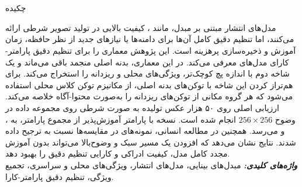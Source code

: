 \newpage
\thispagestyle{empty}
\baselineskip=1.0cm
\ \\ \\
\begin{large}
\begin{center}
چکیده
\end{center}
\end{large}
مدل‌های انتشار مبتنی بر مبدل، مانند ، کیفیت بالایی در تولید تصویر شرطی ارائه می‌کنند، اما تنظیم دقیق کامل آن‌ها برای دامنه‌ها یا نیازهای جدید از نظر حافظه، زمان آموزش و ذخیره‌سازی پرهزینه است. این پژوهش معماری  را برای تنظیم دقیق پارامتر-کارای مدل‌های  معرفی می‌کند. در این معماری، بدنه اصلی  منجمد باقی می‌ماند و یک شاخه دوم با اندازه پچ کوچک‌تر، ویژگی‌های محلی و ریزدانه را استخراج می‌کند. برای هم‌تراز کردن این شاخه با توکن‌های بدنه اصلی، از مکانیزم توکن کلاس محلی استفاده می‌شود که هر گروه مکانی از توکن‌های ریزدانه را به‌صورت محتوا-آگاه خلاصه می‌کند. ارزیابی اصلی روی ۵۰ هزار عکس تولیده به صورت شرطی روی مجموعه داده 
 در وضوح 
 $256 \times 256$
   انجام شده است. نسخه 
    با 
     پارامتر آموزش‌پذیر از مجموع  پارامتر، به ،  و  می‌رسد. همچنین در مطالعه انسانی، نمونه‌های  در  مقایسه‌ها نسبت به  ترجیح داده شدند. نتایج نشان می‌دهد که افزودن یک مسیر سبک و وضوح‌بالا می‌تواند بدون آموزش مجدد کامل مدل، کیفیت ادراکی و کارایی تنظیم دقیق را بهبود دهد.\\
\textit{ \textbf{ واژه‌های کلیدی:}}
مبدل‌های بینایی، مدل‌های انتشار، ویژگی‌های محلی و سراسری، تجمیع ویژگی، تنظیم دقیق پارامتر-کارا.
\newpage

